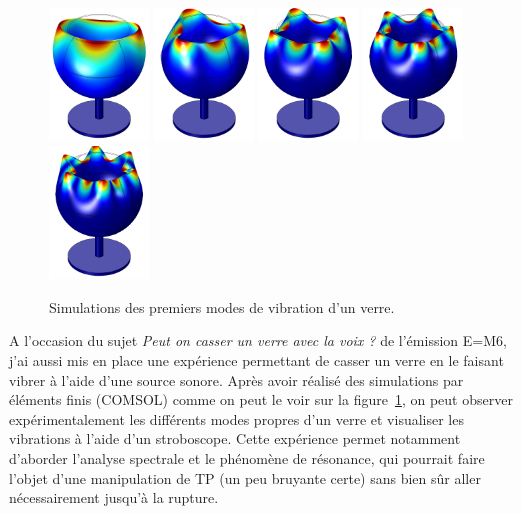 \documentclass[12pt,a4paper]{article}
\begin{document}
\begin{figure}
\center
\includegraphics[height=100pt]{figures/wine_glass_f0.png}
\includegraphics[height=100pt]{figures/wine_glass_f1.png}
\includegraphics[height=100pt]{figures/wine_glass_f2.png}
\includegraphics[height=100pt]{figures/wine_glass_f3.png}
\includegraphics[height=100pt]{figures/wine_glass_f4.png}
\caption{Simulations des premiers modes de vibration d'un verre.}
\label{fig:wine_glass}
\end{figure}

A l'occasion du sujet \textit{Peut on casser un verre avec la voix ?} de l'émission E=M6, j'ai aussi mis en place une expérience permettant de casser un verre en le faisant vibrer à l'aide d'une source sonore.
Après avoir réalisé des simulations par éléments finis (COMSOL) comme on peut le voir sur la figure~\ref{fig:wine_glass}, on peut observer expérimentalement les différents modes propres d'un verre et visualiser les vibrations à l'aide d'un stroboscope.
Cette expérience permet notamment d'aborder l'analyse spectrale et le phénomène de résonance, qui pourrait faire l'objet d'une manipulation de TP (un peu bruyante certe) sans bien sûr aller nécessairement jusqu'à la rupture.
\end{document}
